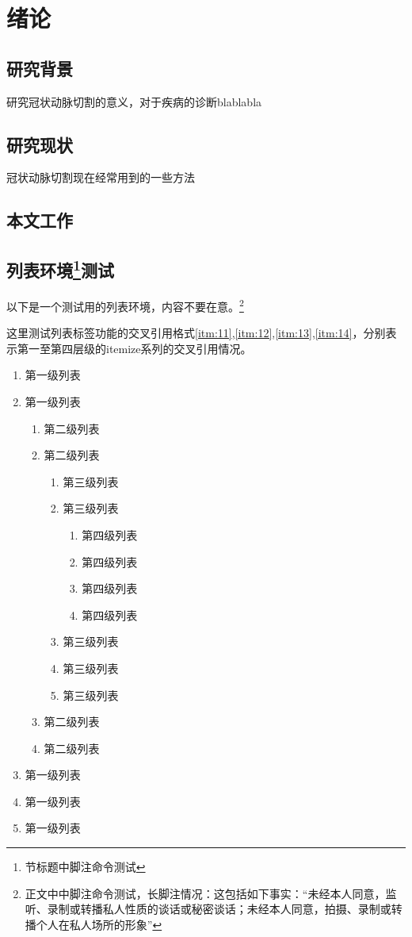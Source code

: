 \chapter{绪论}
\section{研究背景}
研究冠状动脉切割的意义，对于疾病的诊断blablabla
\section{研究现状}
冠状动脉切割现在经常用到的一些方法
\section{本文工作}

\section{列表环境\footnote{节标题中脚注命令测试}测试}
以下是一个测试用的列表环境，内容不要在意。\footnote{正文中中脚注命令测试，长脚注情况：这包括如下事实：“未经本人同意，监听、录制或转播私人性质的谈话或秘密谈话；未经本人同意，拍摄、录制或转播个人在私人场所的形象”}

这里测试列表标签功能的交叉引用格式\ref{itm:11},\ref{itm:12},\ref{itm:13},\ref{itm:14}，分别表示第一至第四层级的itemize系列的交叉引用情况。
\begin{enumerate}
	\item 第一级列表\label{itm:11}
	\item 第一级列表
	\begin{enumerate}
		\item 第二级列表\label{itm:12}
		\item 第二级列表
		\begin{enumerate}
			\item 第三级列表\label{itm:13}
			\item 第三级列表
			\begin{enumerate}
				\item 第四级列表\label{itm:14}
				\item 第四级列表
				\item 第四级列表
				\item 第四级列表
			\end{enumerate}
			\item 第三级列表
			\item 第三级列表
			\item 第三级列表
		\end{enumerate}
		\item 第二级列表
		\item 第二级列表
	\end{enumerate}
	\item 第一级列表
	\item 第一级列表
	\item 第一级列表
\end{enumerate}

